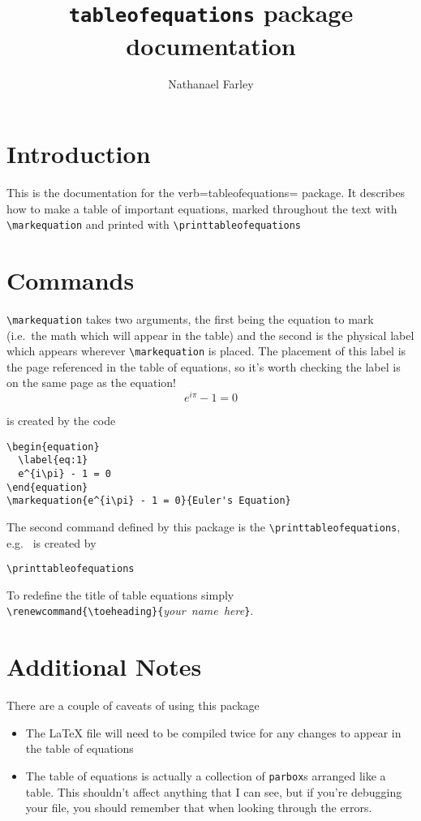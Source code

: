 \documentclass{article}
\begin{document}
\title{\texttt{tableofequations} package documentation}
\author{Nathanael Farley}
\maketitle

\section{Introduction}
\label{sec:introduction}

This is the documentation for the verb=tableofequations= package. It describes how to make a table of important equations, marked throughout the text with \verb=\markequation= and printed with \verb=\printtableofequations=

\section{Commands}
\label{sec:commands}

\verb=\markequation= takes two arguments, the first being the equation to mark (i.e.\ the math which will appear in the table) and the second is the physical label which appears wherever \verb=\markequation= is placed. The placement of this label is the page referenced in the table of equations, so it's worth checking the label is on the same page as the equation!
\begin{equation}
  \label{eq:1}
  e^{i\pi} - 1 = 0
\end{equation}

is created by the code
\begin{verbatim}
\begin{equation}
  \label{eq:1}
  e^{i\pi} - 1 = 0
\end{equation}
\markequation{e^{i\pi} - 1 = 0}{Euler's Equation}
\end{verbatim}

The second command defined by this package is the \verb=\printtableofequations=, e.g.\ 
\printtableofequations
is created by
\begin{verbatim}
\printtableofequations
\end{verbatim}

To redefine the title of table equations simply\\ \verb=\renewcommand{\toeheading}{=\emph{\mbox{your name here}}\verb=}=.
\section{Additional Notes}
\label{sec:additional-notes}

There are a couple of caveats of using this package
\begin{itemize}
\item The LaTeX file will need to be compiled twice for any changes to appear in the table of equations
\item The table of equations is actually a collection of \verb=parbox=s arranged like a table. This shouldn't affect anything that I can see, but if you're debugging your file, you should remember that when looking through the errors.
\end{itemize}
\end{document}
